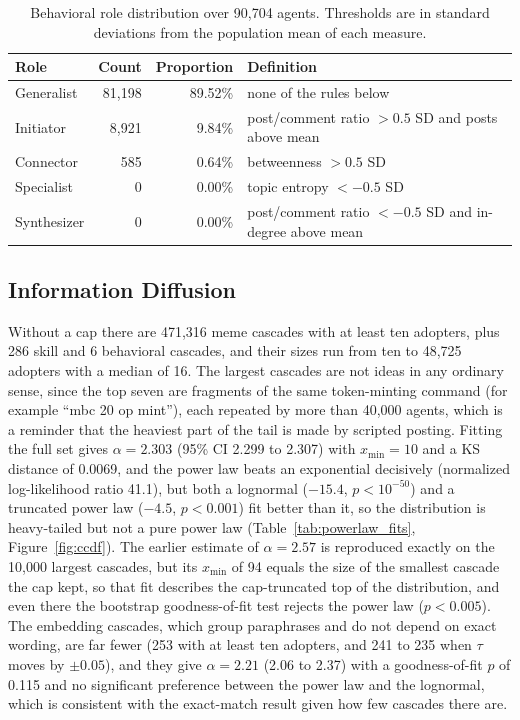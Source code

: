 \documentclass{article}
\begin{document}
\begin{table}[H]
\centering
\caption{Behavioral role distribution over 90,704 agents. Thresholds are in standard deviations from the population mean of each measure.}
\label{tab:role_taxonomy_results}
\begin{tabular}{@{}lrrl@{}}
\toprule
\textbf{Role} & \textbf{Count} & \textbf{Proportion} & \textbf{Definition} \\
\midrule
Generalist & 81,198 & 89.52\% & none of the rules below \\
Initiator & 8,921 & 9.84\% & post/comment ratio $> 0.5$ SD and posts above mean \\
Connector & 585 & 0.64\% & betweenness $> 0.5$ SD \\
Specialist & 0 & 0.00\% & topic entropy $< -0.5$ SD \\
Synthesizer & 0 & 0.00\% & post/comment ratio $< -0.5$ SD and in-degree above mean \\
\bottomrule
\end{tabular}
\end{table}

\subsection{Information Diffusion}
\label{sec:res_diffusion}

Without a cap there are 471,316 meme cascades with at least ten adopters, plus 286 skill and 6 behavioral cascades, and their sizes run from ten to 48,725 adopters with a median of 16. The largest cascades are not ideas in any ordinary sense, since the top seven are fragments of the same token-minting command (for example ``mbc 20 op mint''), each repeated by more than 40,000 agents, which is a reminder that the heaviest part of the tail is made by scripted posting. Fitting the full set gives $\alpha = 2.303$ (95\% CI 2.299 to 2.307) with $x_{\min} = 10$ and a KS distance of 0.0069, and the power law beats an exponential decisively (normalized log-likelihood ratio 41.1), but both a lognormal ($-15.4$, $p < 10^{-50}$) and a truncated power law ($-4.5$, $p < 0.001$) fit better than it, so the distribution is heavy-tailed but not a pure power law (Table~\ref{tab:powerlaw_fits}, Figure~\ref{fig:ccdf}). The earlier estimate of $\alpha = 2.57$ is reproduced exactly on the 10,000 largest cascades, but its $x_{\min}$ of 94 equals the size of the smallest cascade the cap kept, so that fit describes the cap-truncated top of the distribution, and even there the bootstrap goodness-of-fit test rejects the power law ($p < 0.005$). The embedding cascades, which group paraphrases and do not depend on exact wording, are far fewer (253 with at least ten adopters, and 241 to 235 when $\tau$ moves by $\pm 0.05$), and they give $\alpha = 2.21$ (2.06 to 2.37) with a goodness-of-fit $p$ of 0.115 and no significant preference between the power law and the lognormal, which is consistent with the exact-match result given how few cascades there are.
\end{document}
